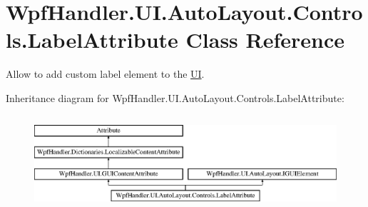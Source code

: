 \hypertarget{class_wpf_handler_1_1_u_i_1_1_auto_layout_1_1_controls_1_1_label_attribute}{}\section{Wpf\+Handler.\+U\+I.\+Auto\+Layout.\+Controls.\+Label\+Attribute Class Reference}
\label{class_wpf_handler_1_1_u_i_1_1_auto_layout_1_1_controls_1_1_label_attribute}


Allow to add custom label element to the \mbox{\hyperlink{namespace_wpf_handler_1_1_u_i}{UI}}.  


Inheritance diagram for Wpf\+Handler.\+U\+I.\+Auto\+Layout.\+Controls.\+Label\+Attribute\+:\begin{figure}[H]
\begin{center}
\leavevmode
\includegraphics[height=3.544304cm]{d9/d7c/class_wpf_handler_1_1_u_i_1_1_auto_layout_1_1_controls_1_1_label_attribute}
\end{center}
\end{figure}

